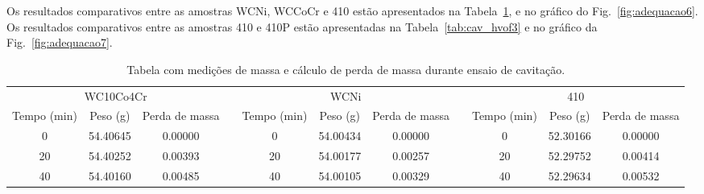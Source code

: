 Os resultados comparativos entre as amostras WCNi, WCCoCr e 410 estão
apresentados na Tabela~\ref{tab:cav_hvof2}, e no gráfico do
Fig.~\ref{fig:adequacao6}. Os resultados comparativos entre as amostras 410 e
410P estão apresentadas na Tabela~\ref{tab:cav_hvof3} e no gráfico da
Fig.~\ref{fig:adequacao7}.

\begin{table}[]
\centering
\caption{Tabela com medições de massa e cálculo de perda de massa durante ensaio de cavitação.}
\label{tab:cav_hvof2}
\begin{tabular}{ccccccccccc}
\cline{1-3} \cline{5-7} \cline{9-11}
\multicolumn{3}{c}{WC10Co4Cr}                                                                           &                       & \multicolumn{3}{c}{WCNi}                                                                               &                       & \multicolumn{3}{c}{410}                                                                                \\ \cline{1-3} \cline{5-7} \cline{9-11} 
\multicolumn{1}{|p{1cm}|}{Tempo (min)} & \multicolumn{1}{p{1.3cm}|}{Peso (g)} &
\multicolumn{1}{p{1.4cm}|}{Perda de massa} & \multicolumn{1}{l|}{} &
\multicolumn{1}{p{1cm}|}{Tempo (min)} & \multicolumn{1}{p{1.3cm}|}{Peso (g)} &
\multicolumn{1}{p{1.4cm}|}{Perda de massa} & \multicolumn{1}{l|}{} &
\multicolumn{1}{p{1cm}|}{Tempo (min)} & \multicolumn{1}{p{1.3cm}|}{Peso (g)} &
\multicolumn{1}{p{1.4cm}|}{Perda de massa} \\ \cline{1-3} \cline{5-7}
\cline{9-11}
\multicolumn{1}{|c|}{0}           & \multicolumn{1}{c|}{54.40645} & \multicolumn{1}{c|}{0.00000}        & \multicolumn{1}{l|}{} & \multicolumn{1}{c|}{0}           & \multicolumn{1}{c|}{54.00434} & \multicolumn{1}{c|}{0.00000}        & \multicolumn{1}{l|}{} & \multicolumn{1}{c|}{0}           & \multicolumn{1}{c|}{52.30166} & \multicolumn{1}{c|}{0.00000}        \\ \cline{1-3} \cline{5-7} \cline{9-11} 
\multicolumn{1}{|c|}{20}          & \multicolumn{1}{c|}{54.40252} & \multicolumn{1}{c|}{0.00393}        & \multicolumn{1}{l|}{} & \multicolumn{1}{c|}{20}          & \multicolumn{1}{c|}{54.00177} & \multicolumn{1}{c|}{0.00257}        & \multicolumn{1}{l|}{} & \multicolumn{1}{c|}{20}          & \multicolumn{1}{c|}{52.29752} & \multicolumn{1}{c|}{0.00414}        \\ \cline{1-3} \cline{5-7} \cline{9-11} 
\multicolumn{1}{|c|}{40}          & \multicolumn{1}{c|}{54.40160} & \multicolumn{1}{c|}{0.00485}        & \multicolumn{1}{l|}{} & \multicolumn{1}{c|}{40}          & \multicolumn{1}{c|}{54.00105} & \multicolumn{1}{c|}{0.00329}        & \multicolumn{1}{l|}{} & \multicolumn{1}{c|}{40}          & \multicolumn{1}{c|}{52.29634} & \multicolumn{1}{c|}{0.00532}        \\ \cline{1-3} \cline{5-7} \cline{9-11} 

\end{tabular}
\end{table}
